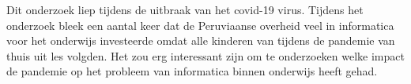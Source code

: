 Dit onderzoek liep tijdens de uitbraak van het covid-19 virus. Tijdens het onderzoek bleek een aantal keer dat de Peruviaanse overheid veel in informatica voor het onderwijs investeerde omdat alle kinderen van tijdens de pandemie van thuis uit les volgden. Het zou erg interessant zijn om te onderzoeken welke impact de pandemie op het probleem van informatica binnen onderwijs heeft gehad.



